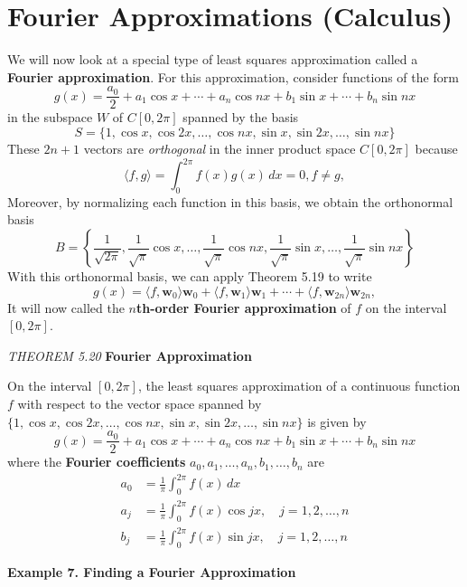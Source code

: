\documentclass{article}
\newcommand\B{\textbf}
\newcommand\la{\langle}
\newcommand\ra{\rangle}
\newcommand\ddfrac[2]{\frac{\displaystyle #1}{\displaystyle #2}}
\begin{document}
    \section{Fourier Approximations (Calculus)}
    We will now look at a special type of least squares approximation called a \textbf{Fourier approximation}. For this 
    approximation, consider functions of the form
    \[g(x) = \ddfrac{a_0}{2} + a_1\cos{x} + \cdots + a_n\cos{nx} + b_1\sin{x} + \cdots + b_n\sin{nx} \]
    in the subspace $W$ of $C[0, 2\pi]$ spanned by the basis
    \[S = \{1, \cos{x}, \cos{2x}, \dots, \cos{nx}, \sin{x}, \sin{2x}, \dots , \sin{nx} \} \]
    These $2n + 1$ vectors are \textit{orthogonal} in the inner product space $C[0, 2\pi]$ because
    \[\la f, g \ra = \int_0^{2\pi} f(x)g(x)\,dx = 0, f \ne g, \]
    Moreover, by normalizing each function in this basis, we obtain the orthonormal basis
    \[B = \left\{ \ddfrac{1}{\sqrt{2\pi}}, \ddfrac{1}{\sqrt{\pi}} \cos{x}, \dots, \ddfrac{1}{\sqrt{\pi}} \cos{nx}, \ddfrac{1}{\sqrt{\pi}} \sin{x}, \dots, \ddfrac{1}{\sqrt{\pi}} \sin{nx}\right\} \]
    With this orthonormal basis, we can apply Theorem 5.19 to write
    \[g(x) = \la f, \B{w}_0 \ra \B{w}_0 + \la f, \B{w}_1 \ra \B{w}_1 + \cdots + \la f, \B{w}_{2n} \ra \B{w}_{2n},\]
    It will now called the \textbf{$n$th-order Fourier approximation} of $f$ on the interval $[0, 2\pi]$.
    \begin{tcolorbox}[colback = {blue9}]
        \textit{THEOREM 5.20} \textbf{Fourier Approximation}

        On the interval $[0, 2\pi]$, the least squares approximation of a continuous function $f$ with respect
        to the vector space spanned by $ \{1, \cos{x}, \cos{2x}, \dots, \cos{nx}, \sin{x}, \sin{2x}, \dots , \sin{nx} \}$ is
        given by
            \[g(x) = \ddfrac{a_0}{2} + a_1\cos{x} + \cdots + a_n\cos{nx} + b_1\sin{x} + \cdots + b_n\sin{nx} \]
        where the \textbf{Fourier coefficients} $a_0, a_1, \dots, a_n, b_1, \dots, b_n$ are
        \begin{equation*}
            \begin{split}
                a_0 &= \ddfrac{1}{\pi}\int_0^{2\pi} f(x)\,dx \\
                a_j &= \ddfrac{1}{\pi}\int_0^{2\pi} f(x) \cos{jx}, \quad j = 1, 2, \dots, n\\
                b_j &=  \ddfrac{1}{\pi}\int_0^{2\pi} f(x) \sin{jx}, \quad j = 1, 2, \dots, n
            \end{split}
        \end{equation*}
    \end{tcolorbox}
    \pagebreak
    \textbf{Example 7. \textcolor{blue5}{Finding a Fourier Approximation}}
\end{document}
